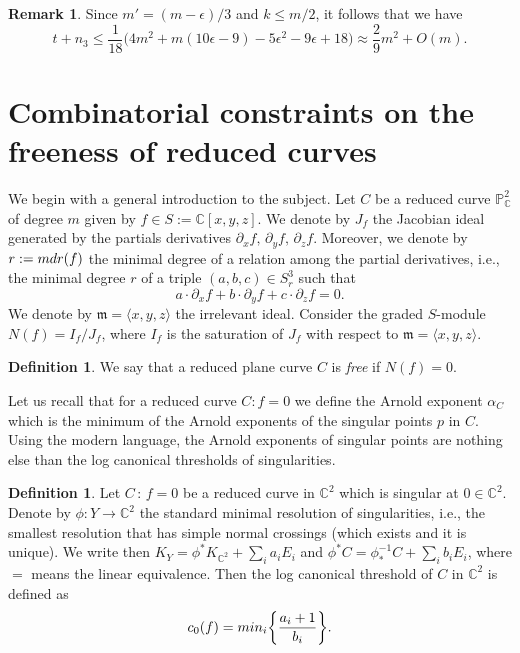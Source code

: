 \documentclass[12pt]{amsart}
\theoremstyle{plain}
\theoremstyle{definition}
\newtheorem{rk}[subsection]{Remark}
\newtheorem{definition}[subsection]{Definition}
\numberwithin{equation}{section}
\begin{document}
\begin{rk}
\label{rk2}
Since $m'=(m-\epsilon)/3$ and $k \leq m/2$, it follows that we have
$$t+n_3 \leq \frac{1}{18}\bigg(4m^2+m(10\epsilon-9)-5\epsilon^2-9\epsilon+18\bigg)\approx \frac{2}{9}m^{2} + O(m).$$
\end{rk}

\section{Combinatorial constraints on the freeness of reduced curves}
We begin with a general introduction to the subject. Let $C$ be a reduced curve $\mathbb{P}^{2}_{\mathbb{C}}$ of degree $m$ given by $f \in S :=\mathbb{C}[x,y,z]$. We denote by $J_{f}$ the Jacobian ideal generated by the partials derivatives $\partial_{x}f, \, \partial_{y}f, \, \partial_{z}f$. Moreover, we denote by $r:={\rm mdr}(f)$ the minimal degree of a relation among the partial derivatives, i.e., the minimal degree $r$ of a triple $(a,b,c) \in S_{r}^{3}$ such that 
$$a\cdot \partial_{x} f + b\cdot \partial_{y}f + c\cdot \partial_{z}f = 0.$$
We denote by $\mathfrak{m} = \langle x,y,z \rangle$ the irrelevant ideal. Consider the graded $S$-module $N(f) = I_{f} / J_{f}$, where $I_{f}$ is the saturation of $J_{f}$ with respect to $\mathfrak{m}=\langle x,y,z\rangle$.
\begin{definition}
We say that a reduced plane curve $C$ is \emph{free} if $N(f) = 0$. 
\end{definition}
Let us recall that for a reduced curve $C : f=0$ we define the Arnold exponent $\alpha_{C}$ which is the minimum of the Arnold exponents of the singular points $p$ in $C$. Using the modern language, the Arnold exponents of singular points are nothing else than the log canonical thresholds of singularities.
\begin{definition}
Let $C \, : \, f = 0$ be a reduced curve in $\mathbb{C}^2$ which is singular at $0 \in \mathbb{C}^{2}$. Denote by $\phi : Y \rightarrow \mathbb{C}^{2}$ the standard minimal resolution of singularities, i.e., the smallest resolution that has simple normal crossings (which exists and it is unique). We write then $K_{Y} = \phi^{*} K_{\mathbb{C}^{2}}+\sum_{i} a_{i} E_{i}$ and $\phi^{*}C = \phi_{*}^{-1} C + \sum_{i} b_{i} E_{i}$, where $=$ means the linear equivalence. Then the log canonical threshold of $C$ in $\mathbb{C}^{2}$ is defined as
$$c_{0}(f) = {\rm min}_{i} \bigg\{ \frac{a_{i}+1}{b_{i}}\bigg\}.$$
\end{definition}
\end{document}
